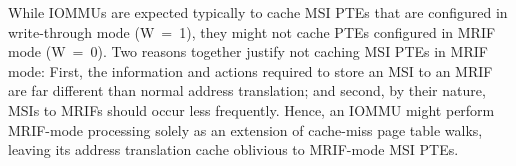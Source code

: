 \begin{commentary}
While \mbox{IOMMU}s are expected typically to cache MSI PTEs that are
configured in write-through mode (W~=~1), they might not cache PTEs
configured in MRIF mode (W~=~0).
Two reasons together justify not caching MSI PTEs in MRIF mode:
First, the information and actions required to store an MSI to an MRIF
are far different than normal address translation; and
second, by their nature, MSIs to MRIFs should occur less frequently.
Hence, an \mbox{IOMMU} might perform MRIF-mode processing solely as
an extension of cache-miss page table walks, leaving its address
translation cache oblivious to MRIF-mode MSI PTEs.
\end{commentary}

